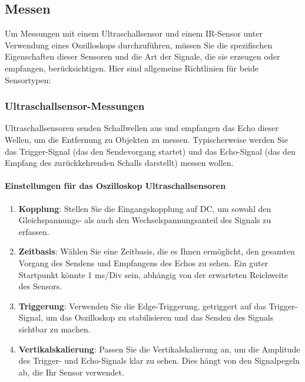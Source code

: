 \documentclass{vorlage-design-main}
\begin{document}
\hypertarget{messen}{%
\subsection{Messen}\label{messen}}

Um Messungen mit einem Ultraschallsensor und einem IR-Sensor unter
Verwendung eines Oszilloskops durchzuführen, müssen Sie die spezifischen
Eigenschaften dieser Sensoren und die Art der Signale, die sie erzeugen
oder empfangen, berücksichtigen. Hier sind allgemeine Richtlinien für
beide Sensortypen:

\hypertarget{ultraschallsensor-messungen}{%
\subsubsection{Ultraschallsensor-Messungen}\label{ultraschallsensor-messungen}}

Ultraschallsensoren senden Schallwellen aus und empfangen das Echo
dieser Wellen, um die Entfernung zu Objekten zu messen. Typischerweise
werden Sie das Trigger-Signal (das den Sendevorgang startet) und das
Echo-Signal (das den Empfang des zurückkehrenden Schalls darstellt)
messen wollen.

\hypertarget{einstellungen-fuxfcr-das-oszilloskop-ultraschallsensoren}{%
\paragraph{Einstellungen für das Oszilloskop
Ultraschallsensoren}\label{einstellungen-fuer-das-oszilloskop-ultraschallsensoren}}

\begin{enumerate}
\def\labelenumi{\arabic{enumi}.}

\item
  \textbf{Kopplung}: Stellen Sie die Eingangskopplung auf DC, um sowohl
  den Gleichspannungs- als auch den Wechselspannungsanteil des Signals
  zu erfassen.
\item
  \textbf{Zeitbasis}: Wählen Sie eine Zeitbasis, die es Ihnen
  ermöglicht, den gesamten Vorgang des Sendens und Empfangens des Echos
  zu sehen. Ein guter Startpunkt könnte 1 ms/Div sein, abhängig von der
  erwarteten Reichweite des Sensors.
\item
  \textbf{Triggerung}: Verwenden Sie die Edge-Triggerung, getriggert auf
  das Trigger-Signal, um das Oszilloskop zu stabilisieren und das Senden
  des Signals sichtbar zu machen.
\item
  \textbf{Vertikalskalierung}: Passen Sie die Vertikalskalierung an, um
  die Amplitude des Trigger- und Echo-Signals klar zu sehen. Dies hängt
  von den Signalpegeln ab, die Ihr Sensor verwendet.
\end{enumerate}
\end{document}
